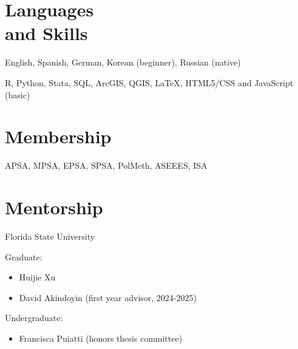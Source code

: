 \documentclass[margin,line,10.95pt]{res}
\newenvironment{list1}{
  \begin{list}{\ding{113}}{%
      \setlength{\itemsep}{0in}
      \setlength{\parsep}{0in} \setlength{\parskip}{0in}
      \setlength{\topsep}{0in} \setlength{\partopsep}{0in}
      \setlength{\leftmargin}{0.17in}}}{\end{list}}
\begin{document}
\begin{resume}

\section{\sc Languages \\ and Skills}
English, Spanish, German, Korean (beginner), Russian (native)
\vspace*{-4.5mm}

R, Python, Stata, SQL, ArcGIS, QGIS, \LaTeX , HTML5/CSS and JavaScript (basic) 
\vspace*{-2.5mm}

\section{\sc Membership}

APSA, MPSA, EPSA, SPSA, PolMeth, ASEEES, ISA

\section{\sc Mentorship}

{Florida State University}\\
\vspace*{-.1in}
\begin{list1}
\item[] Graduate:
\begin{itemize}
	\item Huijie Xu
	\item David Akindoyin (first year advisor, 2024-2025) 
	\end{itemize}
	\item[] Undergraduate:
	\begin{itemize}
	\item Francisca Puiatti (honors thesis committee)

	\end{itemize}
\end{list1}




\end{resume}
\end{document}
